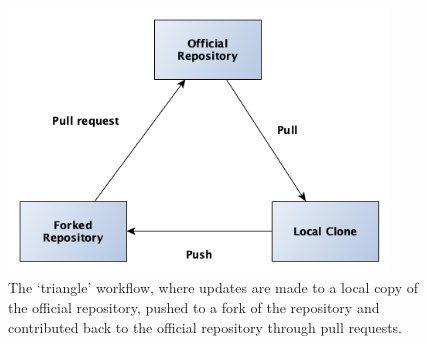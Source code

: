 \documentclass[11pt,a4paper]{ivoa}
\begin{document}
\begin{figure}[th]
  \begin{center}
    \includegraphics[width=0.9\textwidth]{triangle_workflow.png} 
  \end{center}
  \caption{The `triangle' workflow, where updates are made to a local
      copy of the official repository, pushed to a fork of the 
      repository and contributed back to the official repository 
      through pull requests.}
  \label{fig:triangleWorkflow}
\end{figure}
\end{document}
